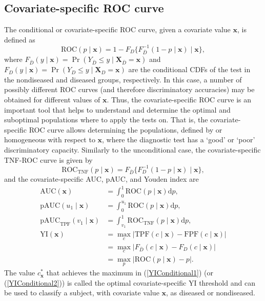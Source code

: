 \subsection{Covariate-specific ROC curve}\label{sec:croc}
The conditional or covariate-specific ROC curve, given a covariate value $\mathbf{x}$, is defined as
\begin{equation}
\text{ROC}(p\mid\mathbf{x}) = 1-F_{D}\{F_{\bar{D}}^{-1}(1-p\mid\mathbf{x})\mid\mathbf{x}\},
\label{ROCConditional}
\end{equation}
where $F_{\bar{D}}(y\mid\mathbf{x}) = \Pr(Y_{\bar{D}}\leq y\mid\mathbf{X}_{\bar{D}}=\mathbf{x})$ and $F_{D}(y\mid\mathbf{x}) = \Pr(Y_{D}\leq y\mid \mathbf{X}_{D}= \mathbf{x})$ are the conditional CDFs of the test in the nondiseased and diseased groups, respectively. In this case, a number of possibly different ROC curves (and therefore discriminatory accuracies) may be obtained for different values of $\mathbf{x}$. Thus, the covariate-specific ROC curve is an important tool that helps to understand and determine the optimal and suboptimal populations where to apply the tests on. That is, the covariate-specific ROC curve allows determining the populations, defined by or homogeneous with respect to $\mathbf{x}$, where the diagnostic test has a `good' or `poor' discriminatory capacity. Similarly to the unconditional case, the covariate-specific TNF-ROC curve is given by
\begin{equation}
\text{ROC}_{\text{TNF}}(p\mid\mathbf{x}) = F_{\bar{D}}\{F_{D}^{-1}(1-p\mid\mathbf{x})\mid\mathbf{x}\},
\label{ROCConditional_TNF}
\end{equation}
and the covariate-specific AUC, pAUC, and Youden index are
\begin{align}
\text{AUC}(\mathbf{x}) & =  \int_{0}^{1}\text{ROC}(p\mid\mathbf{x})\text{d}p, \label{AUCConditional}\\
\text{pAUC}(u_1 \mid \mathbf{x}) & =  \int_{0}^{u_1}\text{ROC}(p\mid\mathbf{x})\text{d}p, \label{pAUCConditional}\\
\text{pAUC}_{\text{TPF}}(v_1 \mid \mathbf{x}) & =  \int_{v_1}^{1}\text{ROC}_{\text{TNF}}(p\mid\mathbf{x})\text{d}p, \label{pAUCConditional2}\\
\text{YI}(\mathbf{x}) & =  \max_{c} \lvert \text{TPF}(c\mid\mathbf{x}) - \text{FPF}(c \mid \mathbf{x}) \rvert \label{YIConditional1}\\
& =  \max_{c}\lvert F_{\bar{D}}(c\mid\mathbf{x}) - F_{D}(c\mid\mathbf{x}) \rvert \label{YIConditional2}\\
& =  \max_{p}\lvert \text{ROC}(p\mid\mathbf{x})- p \rvert \label{YIConditional3}.
\end{align}
The value $c^{*}_{\mathbf{x}}$ that achieves the maximum in (\ref{YIConditional1}) (or (\ref{YIConditional2})) is called the optimal covariate-specific YI threshold and can be used to classify a subject, with covariate value $\mathbf{x}$, as diseased or nondiseased.

